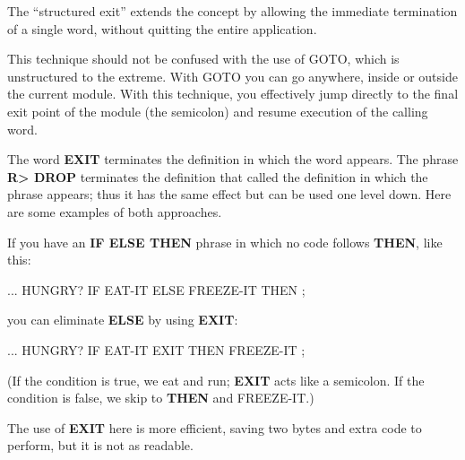 The ``structured exit'' extends the concept by allowing the immediate
termination of a single word, without quitting the entire application.

This technique should not be confused with the use of GOTO, which
is unstructured to the extreme. With GOTO you can go anywhere, inside
or outside the current module. With this technique, you effectively jump
directly to the final exit point of the module (the semicolon) and resume
execution of the calling word.

The word \textbf{EXIT} terminates the definition in which the word appears.
The phrase \textbf{R> DROP} terminates the definition that called the
definition in which the phrase appears; thus it has the same effect but can
be used one level down. Here are some examples of both approaches.

If you have an \textbf{IF ELSE THEN} phrase in which no code follows
\textbf{THEN}, like this:

\begin{Code}
... HUNGRY?  IF  EAT-IT  ELSE  FREEZE-IT  THEN ;
\end{Code}
you can eliminate \textbf{ELSE} by using \textbf{EXIT}:

\begin{Code}
... HUNGRY?  IF EAT-IT EXIT  THEN  FREEZE-IT ;
\end{Code}
(If the condition is true, we eat and run; \textbf{EXIT} acts like a semicolon.
If the condition is false, we skip to \textbf{THEN} and FREEZE-IT.)

The use of \textbf{EXIT} here is more efficient, saving two bytes and extra
code to perform, but it is not as readable.

